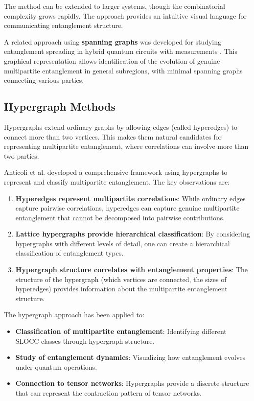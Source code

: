 \documentclass[12pt,a4paper]{article}
\begin{document}
The method can be extended to larger systems, though the combinatorial complexity grows rapidly. The approach provides an intuitive visual language for communicating entanglement structure.

A related approach using \textbf{spanning graphs} was developed for studying entanglement spreading in hybrid quantum circuits with measurements \cite{SpanningGraphs2025}. This graphical representation allows identification of the evolution of genuine multipartite entanglement in general subregions, with minimal spanning graphs connecting various parties.

\subsection{Hypergraph Methods}
\label{sec:hypergraphs}

Hypergraphs extend ordinary graphs by allowing edges (called hyperedges) to connect more than two vertices. This makes them natural candidates for representing multipartite entanglement, where correlations can involve more than two parties.

Anticoli et al. \cite{hypergraphs} developed a comprehensive framework using hypergraphs to represent and classify multipartite entanglement. The key observations are:

\begin{enumerate}
	\item \textbf{Hyperedges represent multipartite correlations}: While ordinary edges capture pairwise correlations, hyperedges can capture genuine multipartite entanglement that cannot be decomposed into pairwise contributions.

	\item \textbf{Lattice hypergraphs provide hierarchical classification}: By considering hypergraphs with different levels of detail, one can create a hierarchical classification of entanglement types.

	\item \textbf{Hypergraph structure correlates with entanglement properties}: The structure of the hypergraph (which vertices are connected, the sizes of hyperedges) provides information about the multipartite entanglement structure.
\end{enumerate}

The hypergraph approach has been applied to:
\begin{itemize}
	\item \textbf{Classification of multipartite entanglement}: Identifying different SLOCC classes through hypergraph structure.
	\item \textbf{Study of entanglement dynamics}: Visualizing how entanglement evolves under quantum operations.
	\item \textbf{Connection to tensor networks}: Hypergraphs provide a discrete structure that can represent the contraction pattern of tensor networks.
\end{itemize}
\end{document}
